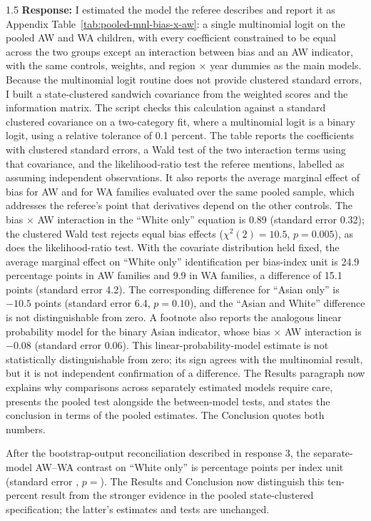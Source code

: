 \documentclass[12pt,english]{article}
\newcommand{\rrxspc}{1.5}
\begin{document}
\begin{refsection}
\begin{spacing}{\rrxspc}
        \textbf{Response:} I estimated the model the referee describes and report it as Appendix Table~\ref{tab:pooled-mnl-bias-x-aw}: a single multinomial logit on the pooled AW and WA children, with every coefficient constrained to be equal across the two groups except an interaction between bias and an AW indicator, with the same controls, weights, and region $\times$ year dummies as the main models. Because the multinomial logit routine does not provide clustered standard errors, I built a state-clustered sandwich covariance from the weighted scores and the information matrix. The script checks this calculation against a standard clustered covariance on a two-category fit, where a multinomial logit is a binary logit, using a relative tolerance of 0.1 percent. The table reports the coefficients with clustered standard errors, a Wald test of the two interaction terms using that covariance, and the likelihood-ratio test the referee mentions, labelled as assuming independent observations. It also reports the average marginal effect of bias for AW and for WA families evaluated over the same pooled sample, which addresses the referee's point that derivatives depend on the other controls. The bias $\times$ AW interaction in the ``White only'' equation is 0.89 (standard error 0.32); the clustered Wald test rejects equal bias effects ($\chi^2(2) = 10.5$, $p = 0.005$), as does the likelihood-ratio test. With the covariate distribution held fixed, the average marginal effect on ``White only'' identification per bias-index unit is 24.9 percentage points in AW families and 9.9 in WA families, a difference of 15.1 points (standard error 4.2). The corresponding difference for ``Asian only'' is $-10.5$ points (standard error 6.4, $p = 0.10$), and the ``Asian and White'' difference is not distinguishable from zero. A footnote also reports the analogous linear probability model for the binary Asian indicator, whose bias $\times$ AW interaction is $-0.08$ (standard error 0.06). This linear-probability-model estimate is not statistically distinguishable from zero; its sign agrees with the multinomial result, but it is not independent confirmation of a difference. The Results paragraph now explains why comparisons across separately estimated models require care, presents the pooled test alongside the between-model tests, and states the conclusion in terms of the pooled estimates. The Conclusion quotes both numbers.

        After the bootstrap-output reconciliation described in response 3, the separate-model AW--WA contrast on ``White only'' is  percentage points per index unit (standard error , $p = $). The Results and Conclusion now distinguish this ten-percent result from the stronger evidence in the pooled state-clustered specification; the latter's estimates and tests are unchanged.
    \end{spacing}


\end{refsection}
\end{document}
